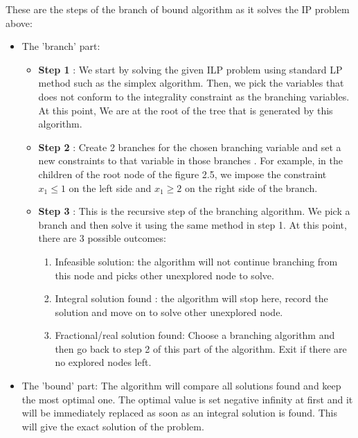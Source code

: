 \documentclass[a4paper, 12pt]{report}
\begin{document}
These are the steps of the branch of bound algorithm as it solves the IP problem above:
\begin{itemize}
\item The 'branch' part:
    \begin{itemize}
        \item \textbf{Step 1} : We start by solving the given ILP problem using standard LP method such as the simplex algorithm. Then, we pick the
         variables that does not conform to the integrality constraint as the branching variables. At this point, We are at the root of
         the tree that is generated by this algorithm.
        \item \textbf{Step 2} : Create 2 branches for the chosen branching variable and set a new constraints to that variable in those branches
        . For example, in the children of the root node of the figure 2.5,
         we impose the constraint \(x_{1} \leq 1\) on the left side and \(x_{1} \geq 2\) on the right side of the branch.
        \item \textbf{Step 3} : This is the recursive step of the branching algorithm. We pick a branch and then solve it
        using the same method in step 1. At this point, there are 3 possible outcomes:
            \begin{enumerate}
                \item Infeasible solution: the algorithm will not continue branching from this node and picks other unexplored node
                to solve.
                \item Integral solution found : the algorithm will stop here, record the solution and move on to solve other unexplored node.
                \item Fractional/real solution found: Choose a branching algorithm and then go back to step 2 of this part of the algorithm.
                Exit if there are no explored nodes left.
            \end{enumerate}
    \end{itemize}
\item The 'bound' part: The algorithm will compare all solutions found and keep the most optimal one. The optimal value is set negative infinity at first
and it will be immediately replaced as soon as an integral solution is found.
 This will give the exact solution of the problem.
\end{itemize}

\vspace{0.5cm}
\end{document}
